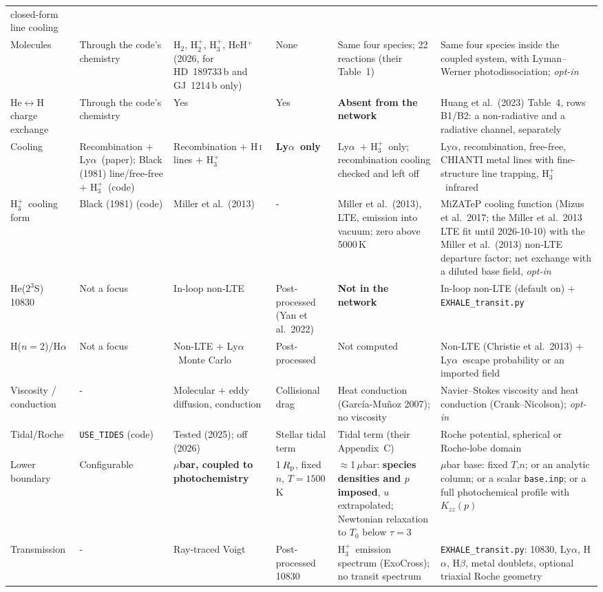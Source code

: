 \documentclass[english,a4paper]{my_memo}
\newcommand{\Rp}{R_{\rm p}}
\newcommand{\Lya}{Ly$\alpha$}
\newcommand{\Ha}{H$\alpha$}
\newcommand{\Kzz}{K_{zz}}
\newcommand{\Hth}{\ensuremath{\mathrm{H}_3^+}}
\newcommand{\Htwo}{\ensuremath{\mathrm{H}_2}}
\begin{document}
{\begin{longtable}{@{}L{0.12\textwidth} L{0.150\textwidth} L{0.150\textwidth}
                    L{0.150\textwidth} L{0.150\textwidth} L{0.150\textwidth}@{}}
closed-form line cooling \\
Molecules & Through the code's chemistry & \Htwo, H$_2^+$, \Hth, HeH$^+$
(2026, for HD~189733\,b and GJ~1214\,b only) & None & Same four species; 22
reactions (their Table~1) & Same four species inside the coupled system, with
Lyman--Werner photodissociation; \emph{opt-in} \\
He$\leftrightarrow$H charge exchange & Through the code's chemistry & Yes &
Yes & \textbf{Absent from the network} & Huang et al.\ (2023) Table~4, rows
B1/B2: a non-radiative and a radiative channel, separately \\
Cooling & Recombination $+$ \Lya\ (paper); Black (1981) line/free-free $+$
\Hth\ (code) & Recombination $+$ H\,\textsc{i} lines $+$ \Hth\ &
\textbf{\Lya\ only} & \Lya\ $+$ \Hth\ only; recombination cooling checked and
left off & \Lya, recombination, free-free, CHIANTI metal lines with
fine-structure line trapping, \Hth\ infrared \\
\Hth\ cooling form & Black (1981) (code) & Miller et al.\ (2013) & - &
Miller et al.\ (2013), LTE, emission into vacuum; zero above 5000\,K &
MiZATeP cooling function (Mizus et al.\ 2017; the Miller et al.\ 2013 LTE fit
until 2026-10-10) with the Miller et al.\ (2013) non-LTE departure factor; net
exchange with a diluted base field, \emph{opt-in} \\
He($2^3$S) 10830 & Not a focus & In-loop non-LTE & Post-processed
(Yan et al.\ 2022) & \textbf{Not in the network} & In-loop non-LTE (default
on) $+$ \texttt{EXHALE\_transit.py} \\
H($n{=}2$)/\Ha & Not a focus & Non-LTE $+$ \Lya\ Monte Carlo & Post-processed &
Not computed & Non-LTE (Christie et al.\ 2013) $+$ \Lya\ escape probability or
an imported field \\
Viscosity / conduction & - & Molecular $+$ eddy diffusion, conduction &
Collisional drag & Heat conduction (Garc\'ia-Mu\~noz 2007); no viscosity &
Navier--Stokes viscosity and heat conduction (Crank--Nicolson); \emph{opt-in}
\\
Tidal/Roche & \texttt{USE\_TIDES} (code) & Tested (2025); off (2026) & Stellar
tidal term & Tidal term (their Appendix~C) & Roche potential, spherical or
Roche-lobe domain \\
Lower boundary & Configurable & \textbf{$\mu$bar, coupled to photochemistry} &
1\,$\Rp$, fixed $n$, $T = 1500$\,K & $\approx$1\,$\mu$bar: \textbf{species
densities and $p$ imposed}, $u$ extrapolated; Newtonian relaxation to $T_0$
below $\tau{=}3$ & $\mu$bar base: fixed $T$,$n$; or an analytic column; or a
scalar \texttt{base.inp}; or a full photochemical profile with $\Kzz(p)$ \\
Transmission & - & Ray-traced Voigt & Post-processed 10830 & \Hth\ emission
spectrum (ExoCross); no transit spectrum &
\texttt{EXHALE\_transit.py}: 10830, \Lya, \Ha, H$\beta$, metal doublets,
optional triaxial Roche geometry \\
\end{longtable}}
\end{document}
